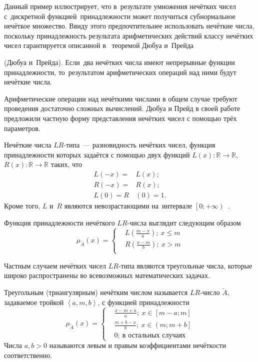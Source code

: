 Данный пример иллюстрирует, что в~результате умножения нечётких чисел с~дискретной функцией~принадлежности может получиться субнормальное нечёткое множество. Ввиду этого предпочтительнее использовать нечёткие числа, поскольку принадлежность результата арифметических действий классу нечётких чисел гарантируется описанной в~\cite{Rutkovskaya} теоремой Дюбуа и~Прейда
\begin{theorem}
\label{th:dubois-prade}
(Дюбуа и~Прейда). Если~два нечётких числа имеют непрерывные функции принадлежности, то~результатом арифметических операций над ними будут нечёткие числа.
\end{theorem}

Арифметические операции над нечёткими числами в общем случае требуют проведения достаточно сложных вычислений. Дюбуа и Прейд в своей работе~\cite{Dubois_Prade} предложили частную форму представления нечётких чисел с помощью трёх параметров.
\begin{mydef}
Нечёткие числа $LR$-типа~--– разновидность нечётких чисел, функция принадлежности которых задаётся с помощью двух функций $L(x):\mathbb{R} \to \mathbb{R}$, $R(x):\mathbb{R} \to \mathbb{R}$ таких, что 
\begin{eqnarray}
	L\left( -x \right)=&L\left( x \right); \\
	R\left( -x \right)=&R\left( x \right); \\
	L\left( 0 \right)=R &\left(  0 \right)=1.
\end{eqnarray}
Кроме того, $L$ и~$R$ являются невозрастающими на~интервале $\left[ 0;+\infty  \right)$~\cite{Rutkovskaya}.
\end{mydef}

Функция принадлежности нечёткого $LR$-числа выглядит следующим образом
\begin{equation}
\label{eq:membership-lr-general}
	 \mu_{\tilde A}\left( x \right)=\left\{ 
		 \begin{aligned}
			 & L\left( \frac{m-x}{a} \right);\ x \leqslant m \\ 
			 & R\left( \frac{x-m}{b} \right);\ x>m \\ 
		 \end{aligned} 
	 \right.
\end{equation}

Частным случаем нечётких чисел $LR$-типа являются треугольные числа, которые широко распространены во всевозможных математических задачах.
\begin{mydef}
Треугольным (триангулярным) нечётким числом называется $LR$-число $\tilde{A}$, задаваемое тройкой $\left\langle a,m,b \right\rangle $, с функцией принадлежности
\begin{equation}
\label{eq:membership-abm-form}
	\mu_{\tilde A}\left( x \right)=
	\left\{ 
		\begin{aligned}
			& \frac{x-m+a}{a};\ x\in \left[ m-a;m \right] \\ 
			& \frac{m+b-x}{b};\ x\in \left( m;m+b \right] \\ 
			& 0;\ \text{в остальных случаях} 
	 	\end{aligned} 
	 \right.
\end{equation}
Числа $a,b>0$ называются левым и правым коэффициентами нечёткости соответственно.
\end{mydef}

